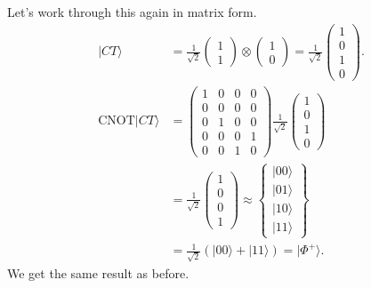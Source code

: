 \documentclass[a4paper, 11pt, normalem]{report}
\begin{document}
\begin{example}
    Let's work through this again in matrix form.
    \begin{align}
        |CT\rangle &= \frac{1}{\sqrt{2}}\begin{pmatrix} 1 \\ 1\end{pmatrix}\otimes\begin{pmatrix}1\\0\end{pmatrix} = \frac{1}{\sqrt{2}}\begin{pmatrix} 1\\0\\1\\0\end{pmatrix}. \\
        \text{CNOT}|CT\rangle &= \begin{pmatrix} 1 & 0 & 0 & 0 \\ 0 & 0 & 0 & 0 \\ 0 & 1 & 0 & 0 \\ 0 & 0 & 0 & 1 \\ 0 & 0 & 1 & 0 \end{pmatrix}\frac{1}{\sqrt{2}}\begin{pmatrix}1\\0\\1\\0\end{pmatrix}\\
                              &= \frac{1}{\sqrt{2}}\begin{pmatrix}1\\0\\0\\1\end{pmatrix} \approx \begin{Bmatrix} |00\rangle \\ |01\rangle \\ |10\rangle \\ |11\rangle\end{Bmatrix} \\
                              &= \frac{1}{\sqrt{2}}\left(|00\rangle+|11\rangle\right) = |\Phi^+\rangle.
    \end{align}
    We get the same result as before.
\end{example}
\end{document}
